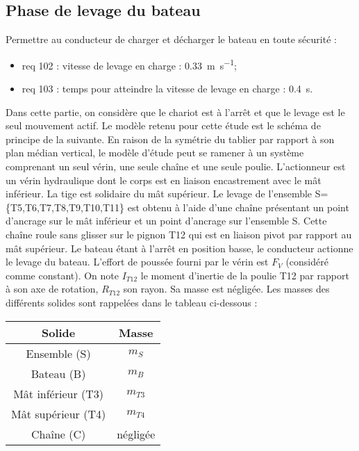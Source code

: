 \begin{multicols}{2}
\subsection*{Phase de levage du bateau}
\begin{obj}
Permettre au conducteur de charger et décharger le bateau en toute sécurité : 
\begin{itemize}
\item req 102 : vitesse de levage en charge : \SI{0,33}{m.s^{-1}};
\item req 103 : temps pour atteindre la vitesse de levage en charge : \SI{0,4}{s}.
\end{itemize}
\end{obj}
Dans cette partie, on considère que le chariot est à l’arrêt et que le levage est le seul mouvement actif. Le modèle retenu pour cette étude est le schéma de principe de la suivante. En raison de la symétrie du tablier par rapport à son plan médian vertical, le modèle d’étude peut se ramener à un système comprenant un seul vérin, une seule chaîne et une seule poulie.%
L’actionneur est un vérin hydraulique dont le corps est en liaison encastrement avec le mât inférieur. La tige est solidaire du mât supérieur. Le levage de l’ensemble S=\{T5,T6,T7,T8,T9,T10,T11\} est obtenu à l’aide d’une chaîne présentant un point d’ancrage sur le mât inférieur et un point d’ancrage sur l’ensemble S. Cette chaîne roule sans glisser sur le pignon T12 qui est en liaison pivot par rapport au mât supérieur.
Le bateau étant à l’arrêt en position basse, le conducteur actionne le levage du bateau.
L’effort de poussée fourni par le vérin est $F_V$ (considéré comme constant). 
On note $I_{T12}$ le moment d’inertie de la poulie T12 par rapport à son axe de rotation, $R_{T12}$ son rayon. Sa masse est négligée.
Les masses des différents solides sont rappelées dans le tableau ci-dessous :
\begin{center}
\begin{tabular}{|c|c|}
\hline 
Solide & Masse \\
\hline
Ensemble (S) & $m_S$ \\ \hline
Bateau (B) & $m_B$ \\ \hline
Mât inférieur (T3) & $m_{T3}$ \\ \hline
Mât supérieur (T4) & $m_{T4}$ \\ \hline
Chaîne (C) & négligée \\ \hline
\end{tabular}
\end{center}


\end{multicols}
